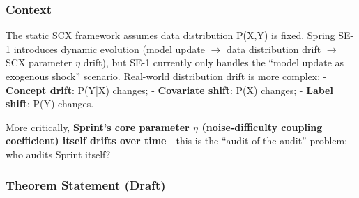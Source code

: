\documentclass[
  12pt,
]{article}
\begin{document}
\subsubsection{Context}\label{context-ts}

The static SCX framework assumes data distribution P(X,Y) is fixed. Spring SE-1 introduces dynamic evolution (model update $\to$ data distribution drift $\to$ SCX parameter $\eta$ drift), but SE-1 currently only handles the ``model update as exogenous shock'' scenario. Real-world distribution drift is more complex:
- \textbf{Concept drift}: P(Y|X) changes;
- \textbf{Covariate shift}: P(X) changes;
- \textbf{Label shift}: P(Y) changes.

More critically, \textbf{Sprint's core parameter $\eta$ (noise-difficulty coupling coefficient) itself drifts over time}---this is the ``audit of the audit'' problem: who audits Sprint itself?

\subsubsection{Theorem Statement (Draft)}\label{ts-statement}
\end{document}
